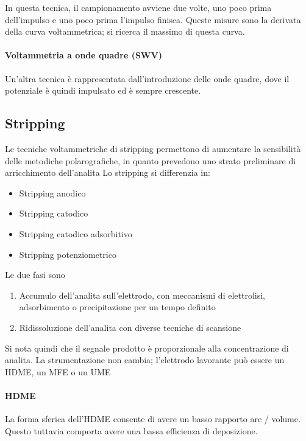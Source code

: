 
In questa tecnica, il campionamento avviene due volte, uno poco prima dell'impulso e uno poco prima l'impulso finisca.
Queste misure sono la derivata della curva voltammetrica; si ricerca il massimo di questa curva.


\paragraph{Voltammetria a onde quadre (SWV)}
Un'altra tecnica è rappresentata dall'introduzione delle onde quadre, dove il potenziale è quindi impulsato ed è sempre crescente.

\subsection{Stripping}
Le tecniche voltammetriche di stripping permettono di aumentare la sensibilità delle metodiche polarografiche, in quanto prevedono uno strato preliminare di arricchimento dell'analita
Lo stripping si differenzia in:
\begin{itemize}
\item Stripping anodico
\item Stripping catodico
\item Stripping catodico adsorbitivo
\item Stripping potenziometrico
\end{itemize}

Le due fasi sono
\begin{enumerate}
\item Accumulo dell'analita sull'elettrodo, con meccanismi di elettrolisi, adsorbimento o precipitazione per un tempo definito
\item Ridissoluzione dell'analita con diverse tecniche di scansione
\end{enumerate}


Si nota quindi che il segnale prodotto è proporzionale alla concentrazione di analita.
La strumentazione non cambia; l'elettrodo lavorante può essere un HDME, un MFE o un UME

\paragraph{HDME}
La forma sferica dell'HDME consente di avere un basso rapporto are / volume.
Questo tuttavia comporta avere una bassa efficienza di deposizione.

